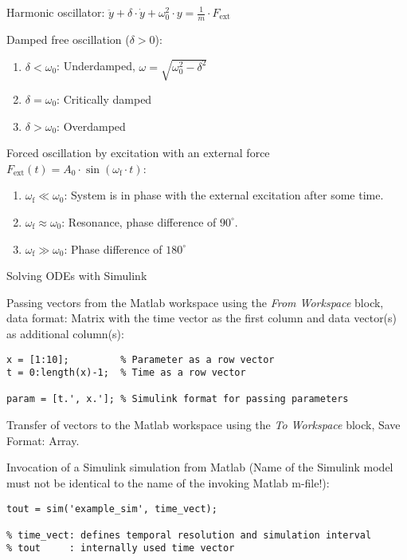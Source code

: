 \documentclass[a4paper,fontsize=11pt,parskip]{scrartcl}
\begin{document}
Harmonic oscillator: $\ddot y + \delta\cdot\dot y + \omega_0^2\cdot y=\frac{1}{m}\cdot F_\text{ext}$

Damped free oscillation ($\delta>0$):
\begin{enumerate}
	\item $\delta<\omega_0$: Underdamped, $\omega=\sqrt{\omega_0^2-\delta^2}$
	\item $\delta=\omega_0$: Critically damped
	\item $\delta>\omega_0$: Overdamped
\end{enumerate}

Forced oscillation by excitation with an external force $F_\text{ext}(t)=A_0\cdot\sin(\omega_\mathrm{f}\cdot t)$:
\begin{enumerate}
	\item $\omega_\mathrm{f}\ll\omega_0$: System is in phase with the external excitation after some time.
	\item $\omega_\mathrm{f}\approx\omega_0$: Resonance, phase difference of $90^\circ$.
	\item $\omega_\mathrm{f}\gg\omega_0$: Phase difference of $180^\circ$
\end{enumerate}

{\Large Solving ODEs with Simulink}

Passing vectors from the Matlab workspace using the \emph{From Workspace} block, data format: Matrix with the time vector as the first column and data vector(s) as additional column(s):
\begin{lstlisting}
x = [1:10];         % Parameter as a row vector
t = 0:length(x)-1;  % Time as a row vector

param = [t.', x.']; % Simulink format for passing parameters
\end{lstlisting}

Transfer of vectors to the Matlab workspace using the \emph{To Workspace} block, Save Format: Array.

Invocation of a Simulink simulation from Matlab (Name of the Simulink model must not be identical to the name of the invoking Matlab m-file!):
\begin{lstlisting}
tout = sim('example_sim', time_vect);

% time_vect: defines temporal resolution and simulation interval
% tout     : internally used time vector
\end{lstlisting}
\end{document}
